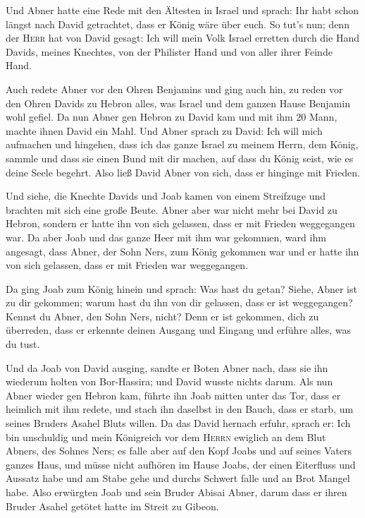  Und Abner hatte eine Rede mit den Ältesten in Israel und
sprach: Ihr habt schon längst nach David getrachtet, dass er König wäre
über euch.  So tut's nun; denn der \textsc{Herr} hat von
David gesagt: Ich will mein Volk Israel erretten durch die Hand Davids,
meines Knechtes, von der Philister Hand und von aller ihrer Feinde Hand.

 Auch redete Abner vor den Ohren Benjamins und ging auch
hin, zu reden vor den Ohren Davids zu Hebron alles, was Israel und dem
ganzen Hause Benjamin wohl gefiel.  Da nun Abner gen
Hebron zu David kam und mit ihm 20 Mann, machte ihnen David ein Mahl.
 Und Abner sprach zu David: Ich will mich aufmachen und
hingehen, dass ich das ganze Israel zu meinem Herrn, dem König, sammle
und dass sie einen Bund mit dir machen, auf dass du König seist, wie es
deine Seele begehrt. Also ließ David Abner von sich, dass er hinginge
mit Frieden.

 Und siehe, die Knechte Davids und Joab kamen von einem
Streifzuge und brachten mit sich eine große Beute. Abner aber war nicht
mehr bei David zu Hebron, sondern er hatte ihn von sich gelassen, dass
er mit Frieden weggegangen war.  Da aber Joab und das
ganze Heer mit ihm war gekommen, ward ihm angesagt, dass Abner, der Sohn
Ners, zum König gekommen war und er hatte ihn von sich gelassen, dass er
mit Frieden war weggegangen.

 Da ging Joab zum König hinein und sprach: Was hast du
getan? Siehe, Abner ist zu dir gekommen; warum hast du ihn von dir
gelassen, dass er ist weggegangen?  Kennst du Abner, den
Sohn Ners, nicht? Denn er ist gekommen, dich zu überreden, dass er
erkennte deinen Ausgang und Eingang und erführe alles, was du tust.

 Und da Joab von David ausging, sandte er Boten Abner
nach, dass sie ihn wiederum holten von Bor-Hassira; und David wusste
nichts darum.  Als nun Abner wieder gen Hebron kam,
führte ihn Joab mitten unter das Tor, dass er heimlich mit ihm redete,
und stach ihn daselbst in den Bauch, dass er starb, um seines Bruders
Asahel Bluts willen.  Da das David hernach erfuhr, sprach
er: Ich bin unschuldig und mein Königreich vor dem \textsc{Herrn}
ewiglich an dem Blut Abners, des Sohnes Ners;  es falle
aber auf den Kopf Joabs und auf seines Vaters ganzes Haus, und müsse
nicht aufhören im Hause Joabs, der einen Eiterfluss und Aussatz habe und
am Stabe gehe und durchs Schwert falle und an Brot Mangel habe.
 Also erwürgten Joab und sein Bruder Abisai Abner, darum
dass er ihren Bruder Asahel getötet hatte im Streit zu Gibeon.

